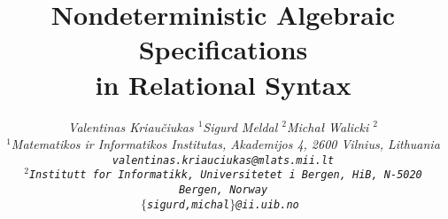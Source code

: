\title{%
Nondeterministic Algebraic Specifications\\
 in Relational Syntax\\}
\date{}
\author{%
\it Valentinas Kriau\v ciukas $^1$\hfill Sigurd Meldal $^2$\hfill  Micha{\l}
Walicki $^2$\\[2ex]
\small$^1$Matematikos ir Informatikos Institutas, Akademijos 4, 2600
Vilnius, Lithuania\\[-.5ex]
\small\tt valentinas.kriauciukas@mlats.mii.lt\\
\small$^2$Institutt for Informatikk,  Universitetet i Bergen, HiB, N-5020
Bergen, Norway\\[-.5ex]
\small\tt $\{$sigurd,michal$\}$@ii.uib.no
}
\newtheorem{claim}{Proposition}[section]
\newtheorem{corollary}[claim]{Corollary}
\newtheorem{theorem}[claim]{Theorem}
\newtheorem{lemma}[claim]{Lemma}
\newtheorem{definition}[claim]{Definition}
\newcommand{\smallerspaces}{\parsep -.2ex plus.2ex minus.2ex\itemsep\parsep
   \vspace{-\topsep}\vspace{.5ex}}
\newcommand{\MyNumEnv}[1]{\parskip 0pt\partopsep 0pt\trivlist \refstepcounter 
   {claim}\item [\hskip \labelsep {\bf #1\ \theclaim\ }]\ignorespaces}
\newenvironment{example}{\MyNumEnv{Example}}{\nopagebreak \finish}
\newenvironment{proof}{{\bf Proof.}}{\nopagebreak\finish}
\newcommand{\finish}{\hspace*{\fill}\nopagebreak 
     \raisebox{-1ex}{$\Box$}\hspace*{1em}\par\addvspace{1ex}}

